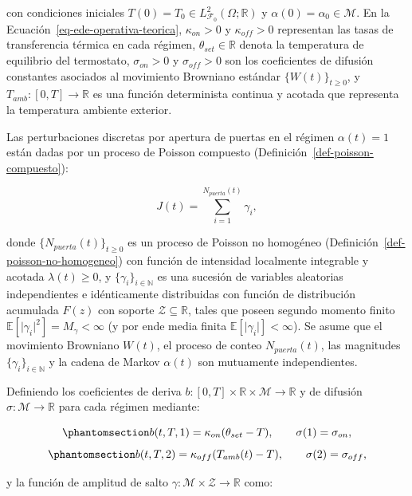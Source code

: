 \documentclass[
  spanish,
  us-letterpaper,
]{scrreprt}
\numberwithin{equation}{section}
\theoremstyle{plain}
\theoremstyle{plain}
\theoremstyle{plain}
\theoremstyle{definition}
\theoremstyle{remark}
\begin{document}
con condiciones iniciales
\(T(0) = T_0 \in L^2_{\mathcal{F}_0}(\Omega; \mathbb{R})\) y
\(\alpha(0) = \alpha_0 \in \mathcal{M}\). En la
Ecuación~\ref{eq-ede-operativa-teorica}, \(\kappa_{on} > 0\) y
\(\kappa_{off} > 0\) representan las tasas de transferencia térmica en
cada régimen, \(\theta_{set} \in \mathbb{R}\) denota la temperatura de
equilibrio del termostato, \(\sigma_{on} > 0\) y \(\sigma_{off} > 0\)
son los coeficientes de difusión constantes asociados al movimiento
Browniano estándar \(\{W(t)\}_{t \ge 0}\), y
\(T_{amb}: [0, T] \to \mathbb{R}\) es una función determinista continua
y acotada que representa la temperatura ambiente exterior.

Las perturbaciones discretas por apertura de puertas en el régimen
\(\alpha(t) = 1\) están dadas por un proceso de Poisson compuesto
(Definición~\ref{def-poisson-compuesto}):

\[
J(t) = \sum_{i=1}^{N_{puerta}(t)} \gamma_i,
\]

donde \(\{N_{puerta}(t)\}_{t \ge 0}\) es un proceso de Poisson no
homogéneo (Definición~\ref{def-poisson-no-homogeneo}) con función de
intensidad localmente integrable y acotada \(\lambda(t) \ge 0\), y
\(\{\gamma_i\}_{i \in \mathbb{N}}\) es una sucesión de variables
aleatorias independientes e idénticamente distribuidas con función de
distribución acumulada \(F(z)\) con soporte
\(\mathcal{Z} \subseteq \mathbb{R}\), tales que poseen segundo momento
finito \(\mathbb{E}[\vert \gamma_i \vert^2] = M_\gamma < \infty\) (y por
ende media finita \(\mathbb{E}[\vert \gamma_i \vert] < \infty\)). Se
asume que el movimiento Browniano \(W(t)\), el proceso de conteo
\(N_{puerta}(t)\), las magnitudes \(\{\gamma_i\}_{i \in \mathbb{N}}\) y
la cadena de Markov \(\alpha(t)\) son mutuamente independientes.

Definiendo los coeficientes de deriva
\(b: [0, T] \times \mathbb{R} \times \mathcal{M} \to \mathbb{R}\) y de
difusión \(\sigma: \mathcal{M} \to \mathbb{R}\) para cada régimen
mediante:

\begin{equation}\phantomsection\label{eq-coeficientes-on}{
b(t, T, 1) = \kappa_{on}(\theta_{set} - T), \qquad \sigma(1) = \sigma_{on},
}\end{equation}
\begin{equation}\phantomsection\label{eq-coeficientes-off}{
b(t, T, 2) = \kappa_{off}(T_{amb}(t) - T), \qquad \sigma(2) = \sigma_{off},
}\end{equation}

y la función de amplitud de salto
\(\gamma: \mathcal{M} \times \mathcal{Z} \to \mathbb{R}\) como:
\end{document}
